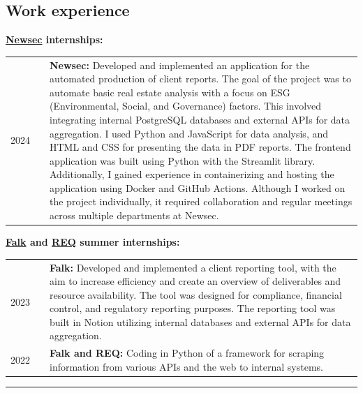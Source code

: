 \documentclass[10pt]{article}
\newlength{\cw}
\newlength{\cwl}
\begin{document}
\subsection*{Work experience}
 
\textbf{\href{https://www.newsec.no/}{Newsec} internships:}

\begin{tabular}{p{\cw} @{:}l p{\cwl}}
  2024 & & \textbf{Newsec:} Developed and implemented an application for the automated production of client reports.
  The goal of the project was to automate basic real estate analysis with a focus on ESG (Environmental, Social, and Governance) factors.
  This involved integrating internal PostgreSQL databases and external APIs for data aggregation.
  I used Python and JavaScript for data analysis, and HTML and CSS for presenting the data in PDF reports.
  The frontend application was built using Python with the Streamlit library.
  Additionally, I gained experience in containerizing and hosting the application using Docker and GitHub Actions.
  Although I worked on the project individually, it required collaboration and regular meetings across multiple departments at Newsec.
  \\
\end{tabular}

\textbf{\href{https://www.falkglobal.no/}{Falk} and \href{https://req.no/}{REQ} summer internships:}

\begin{tabular}{p{\cw} @{:}l p{\cwl}}
  2023 & & \textbf{Falk:} Developed and implemented a client reporting tool, with the aim to increase efficiency and create an overview of deliverables and resource availability.
  The tool was designed for compliance, financial control, and regulatory reporting purposes. The reporting tool was built in Notion utilizing internal databases and external APIs for data aggregation.\\
  2022 & & \textbf{Falk and REQ:} Coding in Python of a framework for scraping information from various APIs and the web to internal systems.
\end{tabular}

\vspace{0.1cm}
\hrule
\vspace{0.1cm}
\end{document}
